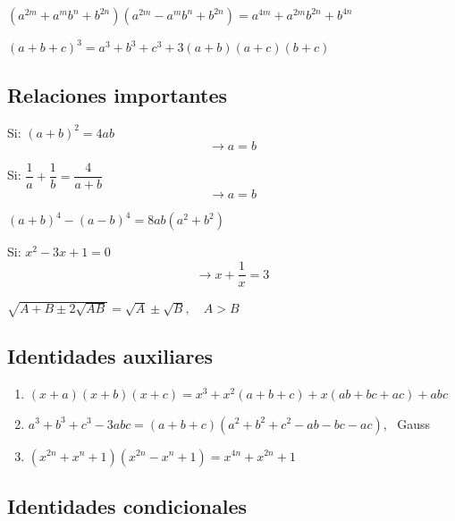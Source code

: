\documentclass[11pt,a4paper]{article}
\newcommand{\cn}[1]{\raisebox{.5pt}{\textcircled{\raisebox{-.9pt}{\scriptsize #1}}}}
\begin{document}
\textbf{\cn{8}} $(a^{2m} + a^mb^n + b^{2n})(a^{2m} - a^mb^n + b^{2n}) = a^{4m} + a^{2m}b^{2n} + b^{4n}$

\textbf{\cn{9}} $(a+b+c)^3 = a^3 + b^3 + c^3 + 3(a+b)(a+c)(b+c)$

\subsection*{Relaciones importantes}

\begin{minipage}[t]{0.320\textwidth}
\cn{1} Si: $(a+b)^2 = 4ab$
\[\rightarrow a = b\]
\end{minipage}\hfill
\begin{minipage}[t]{0.320\textwidth}
\cn{2} Si: $\dfrac{1}{a} + \dfrac{1}{b} = \dfrac{4}{a+b}$
\[\rightarrow a = b\]
\end{minipage}\hfill
\begin{minipage}[t]{0.330\textwidth}
\cn{3} $(a+b)^4 - (a-b)^4 = 8ab(a^2+b^2)$
\end{minipage}

\medskip
\begin{minipage}[t]{0.320\textwidth}
\cn{4} Si: $x^2 - 3x + 1 = 0$
\[\rightarrow x + \frac{1}{x} = 3\]
\end{minipage}\hfill
\begin{minipage}[t]{0.650\textwidth}
\cn{5} $\sqrt{A + B \pm 2\sqrt{AB}} = \sqrt{A} \pm \sqrt{B}, \quad A > B$
\end{minipage}

\subsection*{Identidades auxiliares}
\begin{enumerate}[label=\cn{\arabic*}]
  \item $(x+a)(x+b)(x+c) = x^3 + x^2(a+b+c) + x(ab+bc+ac) + abc$
  \item $a^3 + b^3 + c^3 - 3abc = (a+b+c)(a^2+b^2+c^2-ab-bc-ac)$, \ Gauss
  \item $(x^{2n} + x^n + 1)(x^{2n} - x^n + 1) = x^{4n} + x^{2n} + 1$
\end{enumerate}


\subsection*{Identidades condicionales}
\end{document}

